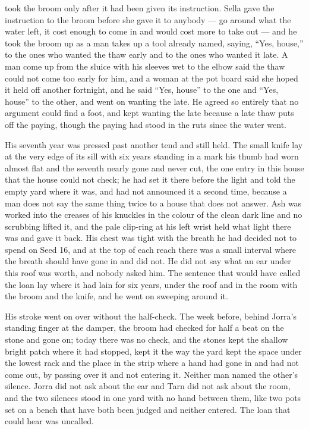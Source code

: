 \scenebreak

 took the broom only after it had been given its instruction. Sella gave the instruction to the broom before she gave it to anybody --- go around what the water left, it cost enough to come in and would cost more to take out --- and he took the broom up as a man takes up a tool already named, saying, “Yes, house,” to the ones who wanted the thaw early and to the ones who wanted it late. A man come up from the sluice with his sleeves wet to the elbow said the thaw could not come too early for him, and a woman at the pot board said she hoped it held off another fortnight, and he said “Yes, house” to the one and “Yes, house” to the other, and went on wanting the late. He agreed so entirely that no argument could find a foot, and kept wanting the late because a late thaw puts off the paying, though the paying had stood in the ruts since the water went.

His seventh year was pressed past another tend and still held. The small knife lay at the very edge of its sill with six years standing in a mark his thumb had worn almost flat and the seventh nearly gone and never cut, the one entry in this house that the house could not check; he had set it there before the light and told the empty yard where it was, and had not announced it a second time, because a man does not say the same thing twice to a house that does not answer. Ash was worked into the creases of his knuckles in the colour of the clean dark line and no scrubbing lifted it, and the pale clip-ring at his left wrist held what light there was and gave it back. His chest was tight with the breath he had decided not to spend on Seed 16, and at the top of each reach there was a small interval where the breath should have gone in and did not. He did not say what an ear under this roof was worth, and nobody asked him. The sentence that would have called the loan lay where it had lain for six years, under the roof and in the room with the broom and the knife, and he went on sweeping around it.

His stroke went on over  without the half-check. The week before, behind Jorra's standing finger at the damper, the broom had checked for half a beat on the stone and gone on; today there was no check, and the stones kept the shallow bright patch where it had stopped, kept it the way the yard kept the space under the lowest rack and the place in the strip where a hand had gone in and had not come out, by passing over it and not entering it. Neither man named the other's silence. Jorra did not ask about the ear and Tarn did not ask about the room, and the two silences stood in one yard with no hand between them, like two pots set on a bench that have both been judged and neither entered. The loan that could hear was uncalled.

